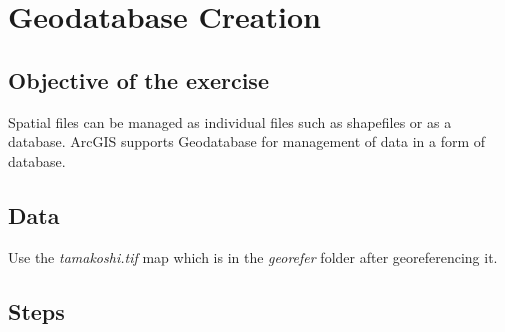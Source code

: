 \chapter{Geodatabase Creation}
\section{Objective of the exercise}
Spatial files can be managed as individual files such as shapefiles or as a database. ArcGIS supports Geodatabase for management of data in a form of database.

\section{Data}
Use the \emph{tamakoshi.tif} map which is in the \emph{georefer} folder after georeferencing it.

\section{Steps}
